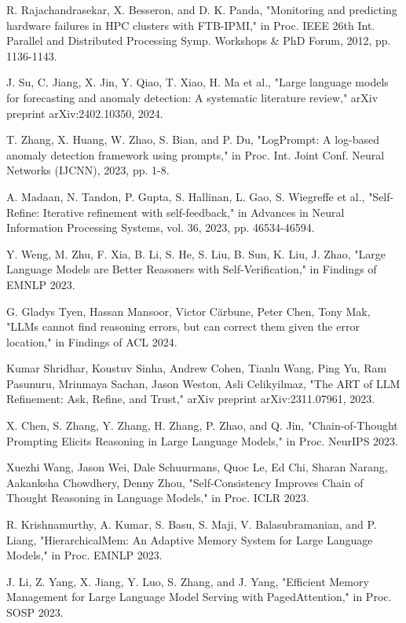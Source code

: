 \documentclass[conference]{IEEEtran}
\begin{document}
\begin{thebibliography}{00}
 R. Rajachandrasekar, X. Besseron, and D. K. Panda, "Monitoring and predicting hardware failures in HPC clusters with FTB-IPMI," in Proc. IEEE 26th Int. Parallel and Distributed Processing Symp. Workshops \& PhD Forum, 2012, pp. 1136-1143.

 J. Su, C. Jiang, X. Jin, Y. Qiao, T. Xiao, H. Ma et al., "Large language models for forecasting and anomaly detection: A systematic literature review," arXiv preprint arXiv:2402.10350, 2024.

 T. Zhang, X. Huang, W. Zhao, S. Bian, and P. Du, "LogPrompt: A log-based anomaly detection framework using prompts," in Proc. Int. Joint Conf. Neural Networks (IJCNN), 2023, pp. 1-8.

 A. Madaan, N. Tandon, P. Gupta, S. Hallinan, L. Gao, S. Wiegreffe et al., "Self-Refine: Iterative refinement with self-feedback," in Advances in Neural Information Processing Systems, vol. 36, 2023, pp. 46534-46594.

 Y. Weng, M. Zhu, F. Xia, B. Li, S. He, S. Liu, B. Sun, K. Liu, J. Zhao, "Large Language Models are Better Reasoners with Self-Verification," in Findings of EMNLP 2023.

 G. Gladys Tyen, Hassan Mansoor, Victor Cărbune, Peter Chen, Tony Mak, "LLMs cannot find reasoning errors, but can correct them given the error location," in Findings of ACL 2024.

 Kumar Shridhar, Koustuv Sinha, Andrew Cohen, Tianlu Wang, Ping Yu, Ram Pasunuru, Mrinmaya Sachan, Jason Weston, Asli Celikyilmaz, "The ART of LLM Refinement: Ask, Refine, and Trust," arXiv preprint arXiv:2311.07961, 2023.

 X. Chen, S. Zhang, Y. Zhang, H. Zhang, P. Zhao, and Q. Jin, "Chain-of-Thought Prompting Elicits Reasoning in Large Language Models," in Proc. NeurIPS 2023.

 Xuezhi Wang, Jason Wei, Dale Schuurmans, Quoc Le, Ed Chi, Sharan Narang, Aakanksha Chowdhery, Denny Zhou, "Self-Consistency Improves Chain of Thought Reasoning in Language Models," in Proc. ICLR 2023.

 R. Krishnamurthy, A. Kumar, S. Basu, S. Maji, V. Balasubramanian, and P. Liang, "HierarchicalMem: An Adaptive Memory System for Large Language Models," in Proc. EMNLP 2023.

 J. Li, Z. Yang, X. Jiang, Y. Luo, S. Zhang, and J. Yang, "Efficient Memory Management for Large Language Model Serving with PagedAttention," in Proc. SOSP 2023.


\end{thebibliography}
\end{document}
